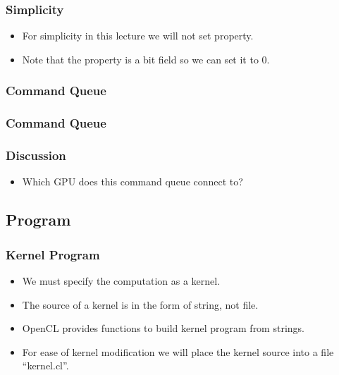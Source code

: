 \documentclass{beamer}
\begin{document}
\begin{frame}
  \frametitle{Simplicity}
  \begin{itemize}
  \item For simplicity in this lecture we will not set property.
  \item Note that the property is a bit field so we can set it to 0.
  \end{itemize}
\end{frame}

\begin{frame}
  \frametitle{Command Queue}
\end{frame}

\begin{frame}
  \frametitle{Command Queue}
  \centerline{}
\end{frame}

\begin{frame}
  \frametitle{Discussion}
  \begin{itemize}
  \item Which GPU does this command queue connect to?
  \end{itemize}
\end{frame}

\subsection{Program}

\begin{frame}
  \frametitle{Kernel Program}
  \begin{itemize}
  \item We must specify the computation as a kernel.
  \item The source of a kernel is in the form of string, not file.
  \item OpenCL provides functions to build kernel program from strings.
  \item For ease of kernel modification we will place the kernel
    source into a file ``kernel.cl''.
  \end{itemize}
\end{frame}

\begin{frame}
\end{frame}
\end{document}
